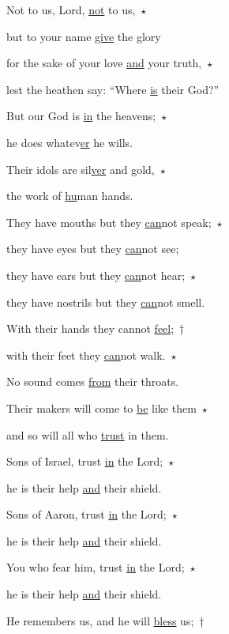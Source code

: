 \noindent Not to us, Lord, \uline{not} to us,~$\star$~\nopagebreak

but to your name \uline{give} the glory

\noindent for the sake of your love \uline{and} your truth,~$\star$~\nopagebreak

lest the heathen say: “Where \uline{is} their God?”



\noindent But our God is \uline{in} the heavens;~$\star$~\nopagebreak

he does whatev\uline{er} he wills.

\noindent Their idols are sil\uline{ver} and gold,~$\star$~\nopagebreak

the work of \uline{hu}man hands.



\noindent They have mouths but they \uline{can}not speak;~$\star$~\nopagebreak

they have eyes but they \uline{can}not see;

\noindent they have ears but they \uline{can}not hear;~$\star$~\nopagebreak

they have nostrils but they \uline{can}not smell.



\noindent With their hands they cannot \uline{feel};~†~\nopagebreak

with their feet they \uline{can}not walk.~$\star$~\nopagebreak

No sound comes \uline{from} their throats.



\noindent Their makers will come to \uline{be} like them~$\star$~\nopagebreak

and so will all who \uline{trust} in them.



\noindent Sons of Israel, trust \uline{in} the Lord;~$\star$~\nopagebreak

he is their help \uline{and} their shield.

\noindent Sons of Aaron, trust \uline{in} the Lord;~$\star$~\nopagebreak

he is their help \uline{and} their shield.



\noindent You who fear him, trust \uline{in} the Lord;~$\star$~\nopagebreak

he is their help \uline{and} their shield.

\noindent He remembers us, and he will \uline{bless} us;~†~\nopagebreak

